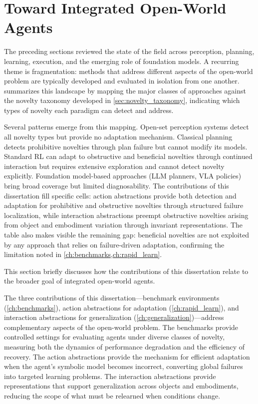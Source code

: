 \section{Toward Integrated Open-World Agents}
\label{sec:perspectives_integration}
\label{sec:related_work_positioning}

The preceding sections reviewed the state of the field across perception, planning, learning, execution, and the emerging role of foundation models. A recurring theme is fragmentation: methods that address different aspects of the open-world problem are typically developed and evaluated in isolation from one another.  summarizes this landscape by mapping the major classes of approaches against the novelty taxonomy developed in \cref{sec:novelty_taxonomy}, indicating which types of novelty each paradigm can detect and address.



Several patterns emerge from this mapping. Open-set perception systems detect all novelty types but provide no adaptation mechanism. Classical planning detects prohibitive novelties through plan failure but cannot modify its models. Standard RL can adapt to obstructive and beneficial novelties through continued interaction but requires extensive exploration and cannot detect novelty explicitly. Foundation model-based approaches (LLM planners, VLA policies) bring broad coverage but limited diagnosability. The contributions of this dissertation fill specific cells: action abstractions provide both detection and adaptation for prohibitive and obstructive novelties through structured failure localization, while interaction abstractions preempt obstructive novelties arising from object and embodiment variation through invariant representations. The table also makes visible the remaining gap: beneficial novelties are not exploited by any approach that relies on failure-driven adaptation, confirming the limitation noted in \cref{ch:benchmarks,ch:rapid_learn}.

This section briefly discusses how the contributions of this dissertation relate to the broader goal of integrated open-world agents.

The three contributions of this dissertation---benchmark environments (\cref{ch:benchmarks}), action abstractions for adaptation (\cref{ch:rapid_learn}), and interaction abstractions for generalization (\cref{ch:generalization})---address complementary aspects of the open-world problem. The benchmarks provide controlled settings for evaluating agents under diverse classes of novelty, measuring both the dynamics of performance degradation and the efficiency of recovery. The action abstractions provide the mechanism for efficient adaptation when the agent's symbolic model becomes incorrect, converting global failures into targeted learning problems. The interaction abstractions provide representations that support generalization across objects and embodiments, reducing the scope of what must be relearned when conditions change.


